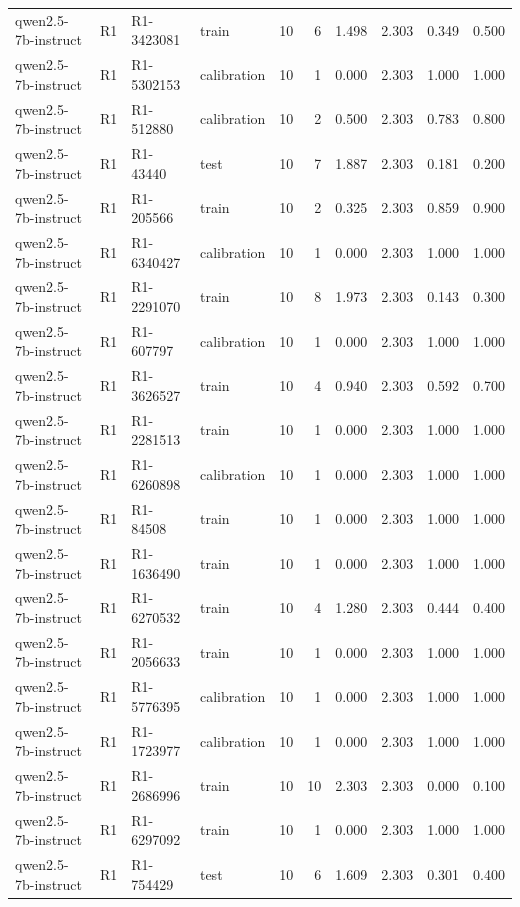 \begin{table}
\begin{tabular}{llllrrrrrr}
qwen2.5-7b-instruct & R1 & R1-3423081 & train & 10 & 6 & 1.498 & 2.303 & 0.349 & 0.500 \\
qwen2.5-7b-instruct & R1 & R1-5302153 & calibration & 10 & 1 & 0.000 & 2.303 & 1.000 & 1.000 \\
qwen2.5-7b-instruct & R1 & R1-512880 & calibration & 10 & 2 & 0.500 & 2.303 & 0.783 & 0.800 \\
qwen2.5-7b-instruct & R1 & R1-43440 & test & 10 & 7 & 1.887 & 2.303 & 0.181 & 0.200 \\
qwen2.5-7b-instruct & R1 & R1-205566 & train & 10 & 2 & 0.325 & 2.303 & 0.859 & 0.900 \\
qwen2.5-7b-instruct & R1 & R1-6340427 & calibration & 10 & 1 & 0.000 & 2.303 & 1.000 & 1.000 \\
qwen2.5-7b-instruct & R1 & R1-2291070 & train & 10 & 8 & 1.973 & 2.303 & 0.143 & 0.300 \\
qwen2.5-7b-instruct & R1 & R1-607797 & calibration & 10 & 1 & 0.000 & 2.303 & 1.000 & 1.000 \\
qwen2.5-7b-instruct & R1 & R1-3626527 & train & 10 & 4 & 0.940 & 2.303 & 0.592 & 0.700 \\
qwen2.5-7b-instruct & R1 & R1-2281513 & train & 10 & 1 & 0.000 & 2.303 & 1.000 & 1.000 \\
qwen2.5-7b-instruct & R1 & R1-6260898 & calibration & 10 & 1 & 0.000 & 2.303 & 1.000 & 1.000 \\
qwen2.5-7b-instruct & R1 & R1-84508 & train & 10 & 1 & 0.000 & 2.303 & 1.000 & 1.000 \\
qwen2.5-7b-instruct & R1 & R1-1636490 & train & 10 & 1 & 0.000 & 2.303 & 1.000 & 1.000 \\
qwen2.5-7b-instruct & R1 & R1-6270532 & train & 10 & 4 & 1.280 & 2.303 & 0.444 & 0.400 \\
qwen2.5-7b-instruct & R1 & R1-2056633 & train & 10 & 1 & 0.000 & 2.303 & 1.000 & 1.000 \\
qwen2.5-7b-instruct & R1 & R1-5776395 & calibration & 10 & 1 & 0.000 & 2.303 & 1.000 & 1.000 \\
qwen2.5-7b-instruct & R1 & R1-1723977 & calibration & 10 & 1 & 0.000 & 2.303 & 1.000 & 1.000 \\
qwen2.5-7b-instruct & R1 & R1-2686996 & train & 10 & 10 & 2.303 & 2.303 & 0.000 & 0.100 \\
qwen2.5-7b-instruct & R1 & R1-6297092 & train & 10 & 1 & 0.000 & 2.303 & 1.000 & 1.000 \\
qwen2.5-7b-instruct & R1 & R1-754429 & test & 10 & 6 & 1.609 & 2.303 & 0.301 & 0.400 \\

\end{tabular}
\end{table}
